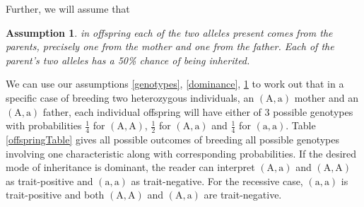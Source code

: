 \documentclass{l4proj}
\newtheorem{assum}{Assumption}
\newcommand{\genotype}[2]{\ensuremath{(\mathrm{#1}, \mathrm{#2})}}
\begin{document}
Further, we will assume that
\begin{assum}\label{offspring}
  in offspring each of the two alleles present comes from the parents, precisely one from the mother and one from the father. Each of the parent's two alleles has a 50\% chance of being inherited.
\end{assum}
We can use our assumptions \ref{genotypes}, \ref{dominance}, \ref{offspring} to work out that in a specific case of breeding two heterozygous individuals, an \genotype{A}{a} mother and an \genotype{A}{a} father, each individual offspring will have either of 3 possible genotypes with probabilities $\frac{1}{4}$ for \genotype{A}{A}, $\frac{1}{2}$ for \genotype{A}{a} and $\frac{1}{4}$ for \genotype{a}{a}. Table \ref{offspringTable} gives all possible outcomes of breeding all possible genotypes involving one characteristic along with corresponding probabilities. If the desired mode of inheritance is dominant, the reader can interpret \genotype{A}{a} and \genotype{A}{A} as trait-positive and \genotype{a}{a} as trait-negative. For the recessive case, \genotype{a}{a} is trait-positive and both \genotype{A}{A} and \genotype{A}{a} are trait-negative.
\end{document}
